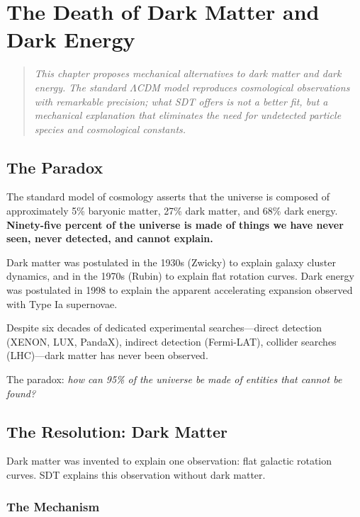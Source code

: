 \chapter{The Death of Dark Matter and Dark Energy}
\label{ch:dark-matter-energy}

\begin{quote}
\emph{This chapter proposes mechanical alternatives to dark matter and dark energy. The standard $\Lambda$CDM model reproduces cosmological observations with remarkable precision; what SDT offers is not a better fit, but a mechanical explanation that eliminates the need for undetected particle species and cosmological constants.}
\end{quote}

\section{The Paradox}

The standard model of cosmology asserts that the universe is composed of approximately 5\% baryonic matter, 27\% dark matter, and 68\% dark energy. \textbf{Ninety-five percent of the universe is made of things we have never seen, never detected, and cannot explain.}

Dark matter was postulated in the 1930s (Zwicky) to explain galaxy cluster dynamics, and in the 1970s (Rubin) to explain flat rotation curves. Dark energy was postulated in 1998 to explain the apparent accelerating expansion observed with Type Ia supernovae.

Despite six decades of dedicated experimental searches---direct detection (XENON, LUX, PandaX), indirect detection (Fermi-LAT), collider searches (LHC)---dark matter has never been observed.

The paradox: \emph{how can 95\% of the universe be made of entities that cannot be found?}


\section{The Resolution: Dark Matter}

Dark matter was invented to explain one observation: flat galactic rotation curves. SDT explains this observation without dark matter.

\subsection{The Mechanism}


